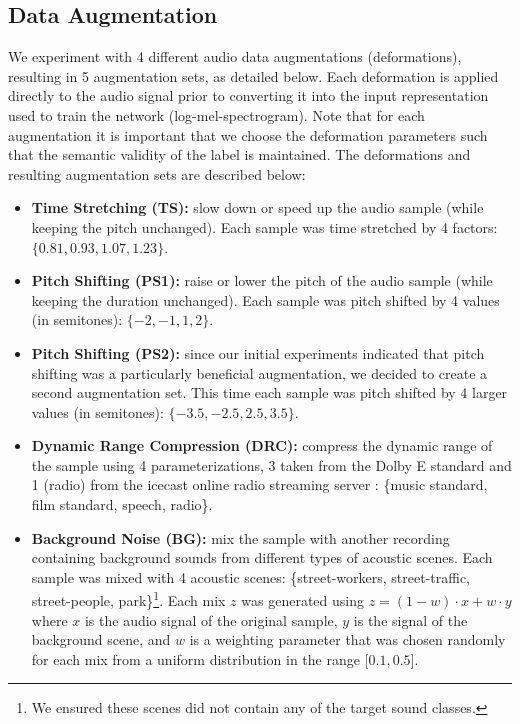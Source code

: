 \documentclass[journal,pdf]{IEEEtran}
\begin{document}
\subsection{Data Augmentation}
\label{sec:method:augmentation}

We experiment with 4 different audio data augmentations (deformations), resulting in 5 augmentation sets, as detailed below. Each deformation is applied directly to the audio signal prior to converting it into the input representation used to train  the network (log-mel-spectrogram). Note that for each augmentation it is important that we choose the deformation parameters such that the semantic validity of the label is maintained. The deformations and resulting augmentation sets are described below:
\begin{itemize}
\item \textbf{Time Stretching (TS):} slow down or speed up the audio sample (while keeping the pitch unchanged). Each sample was time stretched by 4 factors: $\{0.81, 0.93, 1.07, 1.23\}$.
\item \textbf{Pitch Shifting (PS1):} raise or lower the pitch of the audio sample (while keeping the duration unchanged). Each sample was pitch shifted by 4 values (in semitones): $\{-2, -1, 1, 2\}$.
\item \textbf{Pitch Shifting (PS2):} since our initial experiments indicated that pitch shifting was a particularly beneficial augmentation, we decided to create a second augmentation set. This time each sample was pitch shifted by 4 larger values (in semitones): $\{-3.5, -2.5, 2.5, 3.5\}$.
\item \textbf{Dynamic Range Compression (DRC):} compress the dynamic range of the sample using 4 parameterizations, 3 taken from the Dolby E standard \cite{Dolby:DolbyEstandard:MISC:02} and 1 (radio) from the icecast online radio streaming server \cite{Icecast:MudaDRCSettings:MISC:16}: \{music standard, film standard, speech, radio\}.
\item \textbf{Background Noise (BG):} mix the sample with another recording containing background sounds from different types of acoustic scenes. Each sample was mixed with 4 acoustic scenes: \{street-workers, street-traffic, street-people, park\}\footnote{We ensured these scenes did not contain any of the target sound classes.}. Each mix $z$ was generated using $z=(1-w)\cdot{}x + w\cdot{}y$ where $x$ is the audio signal of the original sample, $y$ is the signal of the background scene, and $w$ is a weighting parameter that was chosen randomly for each mix from a uniform distribution in the range $\lbrack0.1,0.5\rbrack$.
\end{itemize}
\end{document}

